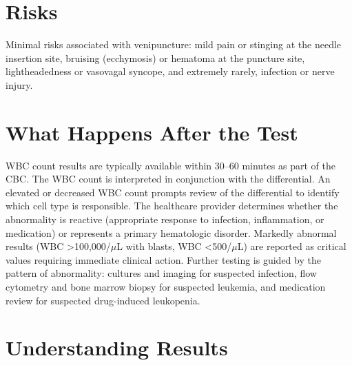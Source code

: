 \section*{Risks}
Minimal risks associated with venipuncture: mild pain or stinging at the needle insertion site, bruising (ecchymosis) or hematoma at the puncture site, lightheadedness or vasovagal syncope, and extremely rarely, infection or nerve injury.

\section*{What Happens After the Test}
WBC count results are typically available within 30--60 minutes as part of the CBC. The WBC count is interpreted in conjunction with the differential. An elevated or decreased WBC count prompts review of the differential to identify which cell type is responsible. The healthcare provider determines whether the abnormality is reactive (appropriate response to infection, inflammation, or medication) or represents a primary hematologic disorder. Markedly abnormal results (WBC >100,000/$\mu$L with blasts, WBC <500/$\mu$L) are reported as critical values requiring immediate clinical action. Further testing is guided by the pattern of abnormality: cultures and imaging for suspected infection, flow cytometry and bone marrow biopsy for suspected leukemia, and medication review for suspected drug-induced leukopenia.

\section*{Understanding Results}


